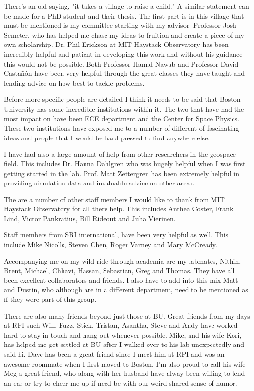 There's an old saying, "it takes a village to raise a child." A similar statement can be made for a PhD student and their thesis. The first part is in this village that must be mentioned is my committee starting with my advisor, Professor Josh Semeter, who has helped me chase my ideas to fruition and create a piece of my own scholarship. Dr. Phil Erickson at MIT Haystack Observatory has been incredibly helpful and patient in developing this work and without his guidance this would not be possible. Both Professor Hamid Nawab and Professor David Castañón have been very helpful through the great classes they have taught and lending advice on how best to tackle problems.

Before more specific people are detailed I think it needs to be said that Boston University has some incredible institutions within it. The two that have had the most impact on have been ECE department and the Center for Space Physics. These two institutions have exposed me to a number of different of fascinating ideas and people that I would be hard pressed to find anywhere else.

I have had also a large amount of help from other researchers in the geospace field. This includes Dr. Hanna Dahlgren who was hugely helpful when I was first getting started in the lab. Prof. Matt Zettergren has been extremely helpful in providing simulation data and invaluable advice on other areas.

The are a number of other staff members I would like to thank from MIT Haystack Observatory for all there help. This includes Anthea Coster, Frank Lind, Victor Pankratius, Bill Rideout and Juha Vierinen. 

Staff members from SRI international, have been very helpful as well. This include Mike Nicolls, Steven Chen, Roger Varney and Mary McCready.
 
Accompanying me on my wild ride through academia are my labmates, Nithin, Brent, Michael, Chhavi, Hassan, Sebastian, Greg and Thomas. They have all been excellent collaborators and friends. I also have to add into this mix Matt and Dustin, who although are in a different department, need to be mentioned as if they were part of this group.

There are also many friends beyond just those at BU. Great friends from my days at RPI such Will, Fuzz, Stick, Tristan, Asantha, Steve and Andy have worked hard to stay in touch and hang out whenever possible. Mike, and his wife Kori, has helped me get settled at BU after I walked over to his lab unexpectedly and said hi. Dave has been a great friend since I meet him at RPI and was an awesome roommate when I first moved to Boston. I'm also proud to call his wife Meg a great friend, who along with her husband have alway been willing to lend an ear or try to cheer me up if need be with our weird shared sense of humor.

